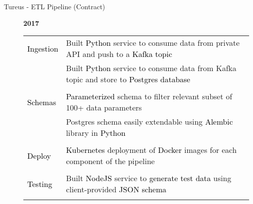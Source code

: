 \documentclass[12pt]{article}
\begin{document}
\begin{description}
\begin{description}
                \item[Tureus - ETL Pipeline (Contract)] \hfill \textbf{2017}\\
                \textcolor{gray}{
                    \begin{tabular}{l|l}
                        \\[-1.0mm]
                        \textcolor{black}{Ingestion}
                            & Built \textcolor{black}{Python} service to consume data from private API and push to a \textcolor{black}{Kafka topic}\\
                            & Built \textcolor{black}{Python} service to consume data from Kafka topic and store to \textcolor{black}{Postgres database}\\
                        \\[-1.7mm]
                        \textcolor{black}{Schemas}   
                            & \textcolor{black}{Parameterized} schema to filter relevant subset of 100+ data parameters\\
                            & Postgres schema easily extendable using \textcolor{black}{Alembic} library in \textcolor{black}{Python}\\
                        \\[-1.7mm]
                        \textcolor{black}{Deploy}
                            & \textcolor{black}{Kubernetes} deployment of \textcolor{black}{Docker} images for each component of the pipeline\\
                        \\[-1.7mm]
                        \textcolor{black}{Testing}
                            & Built \textcolor{black}{NodeJS} service to \textcolor{black}{generate test data} using client-provided \textcolor{black}{JSON schema}\\
                        \\[-1.0mm]
                    \end{tabular}
                }


\end{description}
\end{description}
\end{document}
